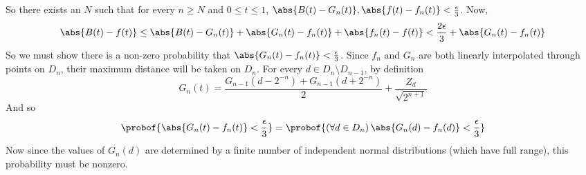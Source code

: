 So there exists an $N$ such that for every $n\geq N$ and $0\leq t\leq1$, $\abs{B(t)-G_n(t)},\abs{f(t)-f_n(t)}<\frac\epsilon3$.
Now,
$$ \abs{B(t) - f(t)} \leq \abs{B(t) - G_n(t)} + \abs{G_n(t) - f_n(t)} + \abs{f_n(t) - f(t)} < \frac{2\epsilon}3 + \abs{G_n(t) - f_n(t)} $$
So we must show there is a non-zero probability that $\abs{G_n(t)-f_n(t)}<\frac\epsilon3$.
Since $f_n$ and $G_n$ are both linearly interpolated through points on $D_n$, their maximum distance will be taken on $D_n$.
For every $d\in D_n\setminus D_{n-1}$, by definition
$$ G_n(t) = \frac{G_{n-1}(d-2^{-n}) + G_{n-1}(d+2^{-n})}2 + \frac{Z_d}{\sqrt{2^{n+1}}} $$
And so
$$ \probof{\abs{G_n(t) - f_n(t)}<\frac\epsilon3} = \probof{(\forall d\in D_n)\,\abs{G_n(d)-f_n(d)}<\frac\epsilon3} $$
Now since the values of $G_n(d)$ are determined by a finite number of independent normal distributions (which have full range), this probability must be nonzero.

\bye

